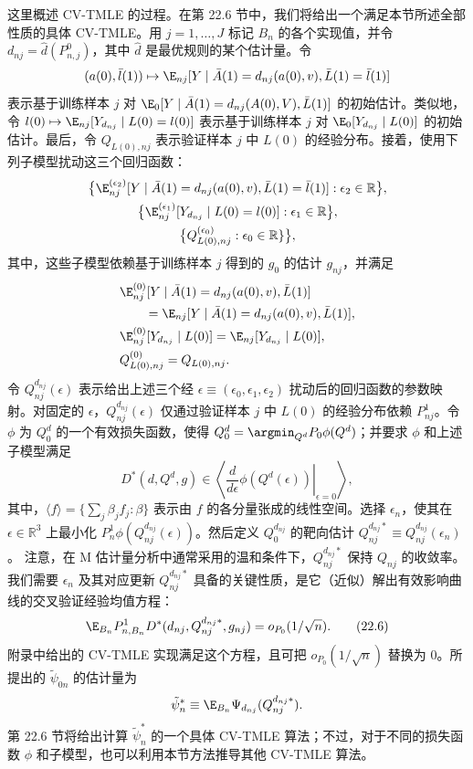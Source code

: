 这里概述 CV-TMLE 的过程。在第 22.6 节中，我们将给出一个满足本节所述全部性质的具体 CV-TMLE。用 $j=1,\ldots,J$ 标记 $B_n$ 的各个实现值，并令 $d_{nj}=\hat d(P_{n,j}^0)$，其中 $\hat d$ 是最优规则的某个估计量。令
\[
 (a(0),\bar l(1))\mapsto
 \E_{nj}[Y\mid\bar A(1)=d_{nj}(a(0),v),\bar L(1)=\bar l(1)]
\]
表示基于训练样本 $j$ 对 $\E_0[Y\mid\bar A(1)=d_{nj}(A(0),V),\bar L(1)]$ 的初始估计。类似地，令
$l(0)\mapsto\E_{nj}[Y_{d_{nj}}\mid L(0)=l(0)]$
表示基于训练样本 $j$ 对 $\E_0[Y_{d_{nj}}\mid L(0)]$ 的初始估计。最后，令 $Q_{L(0),nj}$ 表示验证样本 $j$ 中 $L(0)$ 的经验分布。接着，使用下列子模型扰动这三个回归函数：
\[
\begin{gathered}
 \bigl\{\E_{nj}^{(\epsilon_2)}[Y\mid\bar A(1)=d_{nj}(a(0),v),
 \bar L(1)=\bar l(1)]:\epsilon_2\in\mathbb R\bigr\},\\
 \bigl\{\E_{nj}^{(\epsilon_1)}[Y_{d_{nj}}\mid L(0)=l(0)]:
 \epsilon_1\in\mathbb R\bigr\},\\
 \bigl\{Q_{L(0),nj}^{(\epsilon_0)}:\epsilon_0\in\mathbb R\}\bigr\},
\end{gathered}
\]
其中，这些子模型依赖基于训练样本 $j$ 得到的 $g_0$ 的估计 $g_{nj}$，并满足
\[
\begin{aligned}
 &\E_{nj}^{(0)}[Y\mid\bar A(1)=d_{nj}(a(0),v),\bar L(1)]\\
 &\qquad=\E_{nj}[Y\mid\bar A(1)=d_{nj}(a(0),v),\bar L(1)],\\
 &\E_{nj}^{(0)}[Y_{d_{nj}}\mid L(0)]
 =\E_{nj}[Y_{d_{nj}}\mid L(0)],\\
 &Q_{L(0),nj}^{(0)}=Q_{L(0),nj}.
\end{aligned}
\]
令 $Q_{nj}^{d_{nj}}(\epsilon)$ 表示给出上述三个经 $\epsilon\equiv(\epsilon_0,\epsilon_1,\epsilon_2)$ 扰动后的回归函数的参数映射。对固定的 $\epsilon$，$Q_{nj}^{d_{nj}}(\epsilon)$ 仅通过验证样本 $j$ 中 $L(0)$ 的经验分布依赖 $P_{nj}^1$。令 $\phi$ 为 $Q_0^d$ 的一个有效损失函数，使得 $Q_0^d=\argmin_{Q^d}P_0\phi(Q^d)$；并要求 $\phi$ 和上述子模型满足
\[
 D^*(d,Q^d,g)\in
 \left\langle\left.\frac{d}{d\epsilon}\phi(Q^d(\epsilon))\right|_{\epsilon=0}\right\rangle,
\]
其中，$\langle f\rangle=\{\sum_j\beta_jf_j:\beta\}$ 表示由 $f$ 的各分量张成的线性空间。选择 $\epsilon_n$，使其在 $\epsilon\in\mathbb R^3$ 上最小化 $P_n^1\phi(Q_{nj}^{d_{nj}}(\epsilon))$。然后定义 $Q_0^{d_{nj}}$ 的靶向估计
$Q_{nj}^{d_{nj}*}\equiv Q_{nj}^{d_{nj}}(\epsilon_n)$。
注意，在 M 估计量分析中通常采用的温和条件下，$Q_{nj}^{d_{nj}*}$ 保持 $Q_{nj}$ 的收敛率。我们需要 $\epsilon_n$ 及其对应更新 $Q_{nj}^{d_{nj}*}$ 具备的关键性质，是它（近似）解出有效影响曲线的交叉验证经验均值方程：
\begin{equation}
 \E_{B_n}P_{n,B_n}^1D^*(d_{nj},Q_{nj}^{d_{nj}*},g_{nj})
 =o_{P_0}(1/\sqrt n).
\tag{22.6}
\end{equation}
附录中给出的 CV-TMLE 实现满足这个方程，且可把 $o_{P_0}(1/\sqrt n)$ 替换为 0。所提出的 $\tilde\psi_{0n}$ 的估计量为
\[
 \tilde\psi_n^*\equiv\E_{B_n}\Psi_{d_{nj}}(Q_{nj}^{d_{nj}*}).
\]
第 22.6 节将给出计算 $\tilde\psi_n^*$ 的一个具体 CV-TMLE 算法；不过，对于不同的损失函数 $\phi$ 和子模型，也可以利用本节方法推导其他 CV-TMLE 算法。

